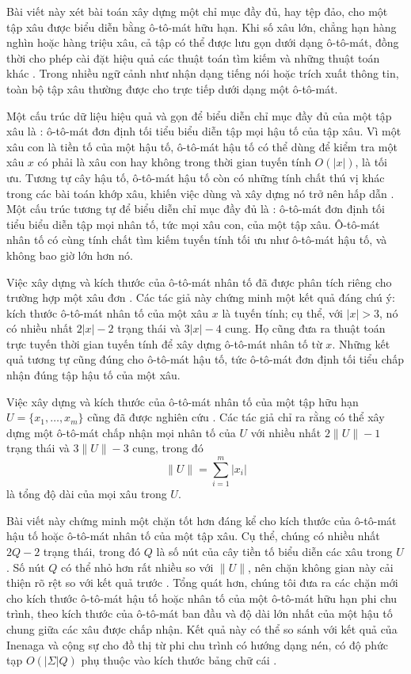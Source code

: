 \documentclass[11pt]{article}
\begin{document}
Bài viết này xét bài toán xây dựng một chỉ mục đầy đủ, hay tệp đảo, cho một
tập xâu được biểu diễn bằng ô-tô-mát hữu hạn. Khi số xâu lớn, chẳng hạn hàng
nghìn hoặc hàng triệu xâu, cả tập có thể được lưu gọn dưới dạng ô-tô-mát, đồng
thời cho phép cài đặt hiệu quả các thuật toán tìm kiếm và những thuật toán
khác \cite{allauzen-index,weinstein-music}. Trong nhiều ngữ cảnh như nhận dạng
tiếng nói hoặc trích xuất thông tin, toàn bộ tập xâu thường được cho trực tiếp
dưới dạng một ô-tô-mát.

Một cấu trúc dữ liệu hiệu quả và gọn để biểu diễn chỉ mục đầy đủ của một tập
xâu là : ô-tô-mát đơn định tối tiểu biểu diễn tập mọi
hậu tố của tập xâu. Vì một xâu con là tiền tố của một hậu tố, ô-tô-mát hậu tố
có thể dùng để kiểm tra một xâu $x$ có phải là xâu con hay không trong thời
gian tuyến tính $O(|x|)$, là tối ưu. Tương tự cây hậu tố, ô-tô-mát hậu tố còn
có những tính chất thú vị khác trong các bài toán khớp xâu, khiến việc dùng và
xây dựng nó trở nên hấp dẫn \cite{gusfield,crochemore-rytter}. Một cấu trúc
tương tự để biểu diễn chỉ mục đầy đủ là : ô-tô-mát đơn
định tối tiểu biểu diễn tập mọi nhân tố, tức mọi xâu con, của một tập xâu.
Ô-tô-mát nhân tố có cùng tính chất tìm kiếm tuyến tính tối ưu như ô-tô-mát hậu
tố, và không bao giờ lớn hơn nó.

Việc xây dựng và kích thước của ô-tô-mát nhân tố đã được phân tích riêng cho
trường hợp một xâu đơn \cite{blumer-smallest,crochemore-transducers}. Các tác
giả này chứng minh một kết quả đáng chú ý: kích thước ô-tô-mát nhân tố của
một xâu $x$ là tuyến tính; cụ thể, với $|x|>3$, nó có nhiều nhất $2|x|-2$
trạng thái và $3|x|-4$ cung. Họ cũng đưa ra thuật toán trực tuyến thời gian
tuyến tính để xây dựng ô-tô-mát nhân tố từ $x$. Những kết quả tương tự cũng
đúng cho ô-tô-mát hậu tố, tức ô-tô-mát đơn định tối tiểu chấp nhận đúng tập
hậu tố của một xâu.

Việc xây dựng và kích thước của ô-tô-mát nhân tố của một tập hữu hạn
$U=\{x_1,\ldots,x_m\}$ cũng đã được nghiên cứu \cite{blumer-complete}. Các tác
giả chỉ ra rằng có thể xây dựng một ô-tô-mát chấp nhận mọi nhân tố của $U$ với
nhiều nhất $2\|U\|-1$ trạng thái và $3\|U\|-3$ cung, trong đó
\[
  \|U\|=\sum_{i=1}^m |x_i|
\]
là tổng độ dài của mọi xâu trong $U$.

Bài viết này chứng minh một chặn tốt hơn đáng kể cho kích thước của ô-tô-mát
hậu tố hoặc ô-tô-mát nhân tố của một tập xâu. Cụ thể, chúng có nhiều nhất
$2Q-2$ trạng thái, trong đó $Q$ là số nút của cây tiền tố biểu diễn các xâu
trong $U$. Số nút $Q$ có thể nhỏ hơn rất nhiều so với $\|U\|$, nên chặn không
gian này cải thiện rõ rệt so với kết quả trước \cite{blumer-complete}. Tổng
quát hơn, chúng tôi đưa ra các chặn mới cho kích thước ô-tô-mát hậu tố hoặc
nhân tố của một ô-tô-mát hữu hạn phi chu trình, theo kích thước của ô-tô-mát
ban đầu và độ dài lớn nhất của một hậu tố chung giữa các xâu được chấp nhận.
Kết quả này có thể so sánh với kết quả của Inenaga và cộng sự cho đồ thị từ
phi chu trình có hướng dạng nén, có độ phức tạp $O(|\Sigma|Q)$ phụ thuộc vào
kích thước bảng chữ cái \cite{inenaga}.
\end{document}
